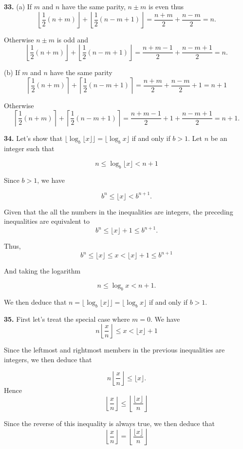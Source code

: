 \documentclass[a4paper,12pt]{article}
\newcommand{\newpar}[1]{\bigskip \noindent \textbf{#1.}}
\newcommand{\subpar}[1]{\medskip \noindent (#1)}
\begin{document}
\newpar{33} \subpar{a}  If $m$ and $n$ have the same parity, $n
\pm m$ is even thus
\[\left\lfloor \frac{1}{2}(n+m)\right\rfloor + \left\lfloor
\frac{1}{2}(n-m+1)\right\rfloor = \frac{n+m}{2} + \frac{n-m}{2} = n.\]

Otherwise $n\pm m$ is odd and
\[\left\lfloor \frac{1}{2}(n+m)\right\rfloor + \left\lfloor
\frac{1}{2}(n-m+1)\right\rfloor = \frac{n+m-1}{2} + \frac{n-m+1}{2} =
n.\]

\subpar{b} If $m$ and $n$ have the same parity
\[\left\lceil \frac{1}{2}(n+m)\right\rceil + \left\lceil
\frac{1}{2}(n-m+1) \right\rceil = \frac{n+m}{2} + \frac{n-m}{2} + 1 =
n+1\]

Otherwise
\[\left\lceil \frac{1}{2}(n+m)\right\rceil + \left\lceil
\frac{1}{2}(n-m+1) \right\rceil = \frac{n+m-1}{2} + 1 +
\frac{n-m+1}{2} = n+1.\]

\newpar{34} Let's show that $\lfloor \log_b \lfloor x\rfloor \rfloor =
\lfloor \log_b x \rfloor$ if and only if $b > 1$.  Let $n$ be an
integer such that

\[ n \le \log_b \lfloor x\rfloor < n+1\]

Since $b>1$, we have

\[ b^n \le \lfloor x\rfloor < b^{n+1}.\]

Given that the all the numbers in the inequalities are integers, the
preceding inequalities are equivalent to
\[ b^n \le \lfloor x\rfloor +1\le b^{n+1}.\]

Thus,
\[ b^n \le \lfloor x\rfloor \le x < \lfloor x\rfloor + 1 \le b^{n+1}\]

And taking the logarithm

\[ n \le \log_b x < n+1.\]

We then deduce that $n = \lfloor \log_b \lfloor x\rfloor \rfloor =
\lfloor \log_b x\rfloor$ if and only if $b>1$.

\newpar{35} First let's treat the special case where $m=0$.  We have
\[ n \left\lfloor \frac{x}{n}\right\rfloor \le x < \lfloor x\rfloor +
1\]

Since the leftmost and rightmost members in the previous inequalities
are integers, we then deduce that

\[ n \left\lfloor \frac{x}{n}\right\rfloor \le \lfloor x\rfloor.\]
Hence \[ \left\lfloor \frac{x}{n}\right\rfloor \le \left\lfloor
\frac{\lfloor x\rfloor}{n}\right\rfloor\]

Since the reverse of this inequality is always true, we then deduce
that
\[ \left\lfloor \frac{x}{n}\right\rfloor = \left\lfloor
\frac{\lfloor x\rfloor}{n}\right\rfloor\]
\end{document}

